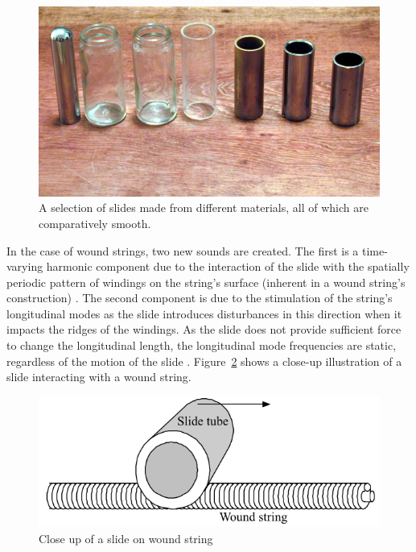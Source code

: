 \documentclass[../main.tex]{subfiles}
\begin{document}
\begin{figure}[h]
    \centering
    \includegraphics[scale=.35]{./images/pictures/Slide-guitar-different-slides-768x427.jpg}
    \caption{A selection of slides made from different materials, all of which are comparatively smooth.}
    \label{fig:slide_types}
\end{figure}

In the case of wound strings, two new sounds are created. The first is a time-varying harmonic component due to the interaction of the slide with the spatially periodic pattern of windings on the string’s surface (inherent in a wound string’s construction) . The second component is due to the stimulation of the string’s longitudinal modes as the slide introduces disturbances in this direction when it impacts the ridges of the windings. As the slide does not provide sufficient force to change the longitudinal length, the longitudinal mode frequencies are static, regardless of the motion of the slide . Figure~\ref{fig:slide_string_zoom} shows a close-up illustration of a slide interacting with a wound string.

\begin{figure}[h]
    \centering
    \includegraphics[scale=1]{./images/pictures/slide_wound_string_zoom.PNG}
    \caption{Close up of a slide on wound string }
    \label{fig:slide_string_zoom}
\end{figure}
\end{document}
